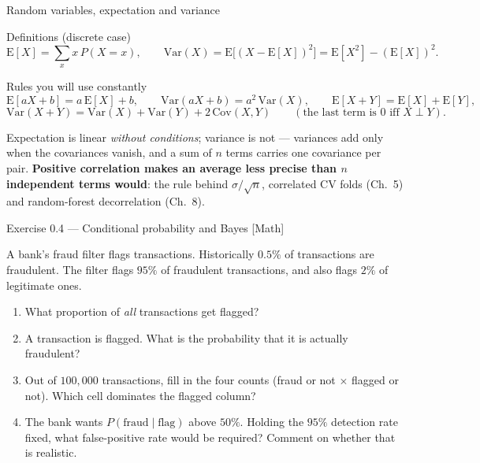 \documentclass[aspectratio=169,11pt]{beamer}
\begin{document}
\begin{frame}{Random variables, expectation and variance}
  \begin{block}{Definitions (discrete case)}
    \[
      \mathrm{E}[X] = \sum_x x\,P(X=x),
      \qquad
      \mathrm{Var}(X) = \mathrm{E}\bigl[(X - \mathrm{E}[X])^2\bigr]
                      = \mathrm{E}[X^2] - (\mathrm{E}[X])^2 .
    \]
  \end{block}
  \begin{block}{Rules you will use constantly}
    \footnotesize
    \[
      \mathrm{E}[aX + b] = a\,\mathrm{E}[X] + b,
      \qquad
      \mathrm{Var}(aX + b) = a^2\,\mathrm{Var}(X),
      \qquad
      \mathrm{E}[X + Y] = \mathrm{E}[X] + \mathrm{E}[Y] ,
    \]
    \[
      \mathrm{Var}(X + Y) = \mathrm{Var}(X) + \mathrm{Var}(Y)
        + 2\,\mathrm{Cov}(X, Y)
      \qquad (\text{the last term is } 0 \text{ iff } X \perp Y) .
    \]
  \end{block}
  \begin{takeaway}
    Expectation is linear \emph{without conditions}; variance is not ---
    variances add only when the covariances vanish, and a sum of $n$ terms
    carries one covariance per pair. \textbf{Positive correlation makes an
    average less precise than $n$ independent terms would}: the rule behind
    $\sigma/\sqrt n$, correlated CV folds (Ch.\ 5) and random-forest
    decorrelation (Ch.\ 8).
  \end{takeaway}
\end{frame}

\begin{frame}{Exercise 0.4 --- Conditional probability and Bayes [Math]}
  \begin{exercise}
    A bank's fraud filter flags transactions. Historically $0.5\%$ of
    transactions are fraudulent. The filter flags $95\%$ of fraudulent
    transactions, and also flags $2\%$ of legitimate ones.
    \begin{enumerate}
      \item What proportion of \emph{all} transactions get flagged?
      \item A transaction is flagged. What is the probability that it is
            actually fraudulent?
      \item Out of $100{,}000$ transactions, fill in the four counts (fraud
            or not $\times$ flagged or not). Which cell dominates the flagged
            column?
      \item The bank wants $P(\text{fraud} \mid \text{flag})$ above $50\%$.
            Holding the $95\%$ detection rate fixed, what false-positive rate
            would be required? Comment on whether that is realistic.
    \end{enumerate}
  \end{exercise}
\end{frame}
\end{document}
